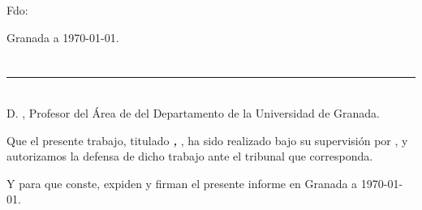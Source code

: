 \vspace{6cm}

\noindent Fdo: \emph{\estudiante}

\vspace{2cm}

\begin{flushright}
Granada a \today.
\end{flushright}


\chapter*{}
\thispagestyle{empty}

\noindent\rule[-1ex]{\textwidth}{2pt}\\[4.5ex]

D. \textbf{\tutorA}, Profesor del Área de {\areaA} del Departamento {\departamentoA} de la Universidad de Granada.

\vspace{0.5cm}


\vspace{0.5cm}


\vspace{0.5cm}

Que el presente trabajo, titulado \textit{\textbf{\tituloTFM, \subtituloTFM}},
ha sido realizado bajo su supervisión por \textbf{\estudiante}, y autorizamos la defensa de dicho trabajo ante el tribunal
que corresponda.

\vspace{0.5cm}

Y para que conste, expiden y firman el presente informe en Granada a \today.

\vspace{1cm}


\vspace{5cm}



